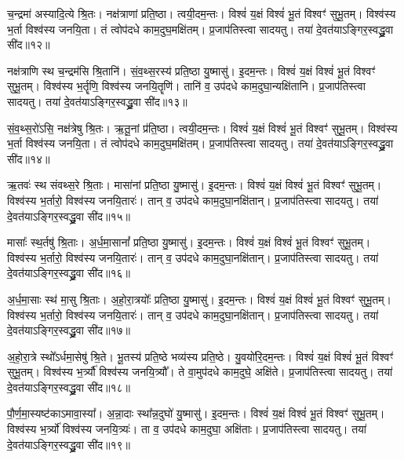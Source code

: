    च॒न्द्रमा॑ अस्यादि॒त्ये श्रि॒तः।
   नक्ष॑त्राणां प्रति॒ष्ठा।
   त्वयी॒दम॒न्तः।
   विश्वं॑ य॒क्षं विश्वं॑ भू॒तं विश्वꣳ॑ सुभू॒तम्।
   विश्व॑स्य भ॒र्ता विश्व॑स्य जनयि॒ता।
   तं त्वोप॑दधे काम॒दुघ॒मक्षि॑तम्।
   प्र॒जाप॑तिस्त्वा सादयतु।
   तया॑ दे॒वत॑याऽङ्गिर॒स्वद्ध्रु॒वा सी॑द॥१२॥

   नक्ष॑त्राणि स्थ च॒न्द्रम॑सि श्रि॒तानि॑।
   सं॒व॒थ्स॒रस्य॑ प्रति॒ष्ठा यु॒ष्मासु॑। 
   इ॒दम॒न्तः।
   विश्वं॑ य॒क्षं विश्वं॑ भू॒तं विश्वꣳ॑ सुभू॒तम्।
   विश्व॑स्य भ॒र्तॄणि॒ विश्व॑स्य जनयि॒तॄणि॑।
   तानि॑ व॒ उप॑दधे काम॒दुघा॒न्यक्षि॑तानि।
   प्र॒जाप॑तिस्त्वा सादयतु।
   तया॑ दे॒वत॑याऽङ्गिर॒स्वद्ध्रु॒वा सी॑द॥१३॥

   सं॒व॒थ्स॒रो॑ऽसि॒ नक्ष॑त्रेषु श्रि॒तः।
   ऋ॒तू॒नां प्र॑ति॒ष्ठा। 
   त्वयी॒दम॒न्तः।
   विश्वं॑ य॒क्षं विश्वं॑ भू॒तं विश्वꣳ॑ सुभू॒तम्।
   विश्व॑स्य भ॒र्ता विश्व॑स्य जनयि॒ता।
   तं त्वोप॑दधे काम॒दुघ॒मक्षि॑तम्।
   प्र॒जाप॑तिस्त्वा सादयतु।
   तया॑ दे॒वत॑याऽङ्गिर॒स्वद्ध्रु॒वा सी॑द॥१४॥

   ऋ॒तवः॑ स्थ संवथ्स॒रे श्रि॒ताः।
   मासा॑नां प्रति॒ष्ठा यु॒ष्मासु॑। 
   इ॒दम॒न्तः।
   विश्वं॑ य॒क्षं विश्वं॑ भू॒तं विश्वꣳ॑ सुभू॒तम्।
   विश्व॑स्य भ॒र्तारो॒ विश्व॑स्य जनयि॒तारः॑।
   तान् व॒ उप॑दधे काम॒दुघा॒नक्षि॑तान्।
   प्र॒जाप॑तिस्त्वा सादयतु।
   तया॑ दे॒वत॑याऽङ्गिर॒स्वद्ध्रु॒वा सी॑द॥१५॥

   मासाः᳚ स्थ॒र्तषु॑ श्रि॒ताः।
   अ॒र्ध॒मा॒सानां᳚ प्रति॒ष्ठा यु॒ष्मासु॑। 
   इ॒दम॒न्तः।
   विश्वं॑ य॒क्षं विश्वं॑ भू॒तं विश्वꣳ॑ सुभू॒तम्।
   विश्व॑स्य भ॒र्तारो॒ विश्व॑स्य जनयि॒तारः॑।
   तान् व॒ उप॑दधे काम॒दुघा॒नक्षि॑तान्।
   प्र॒जाप॑तिस्त्वा सादयतु।
   तया॑ दे॒वत॑याऽङ्गिर॒स्वद्ध्रु॒वा सी॑द॥१६॥

   अ॒र्ध॒मा॒साः स्थ॑ मा॒सु श्रि॒ताः।
   अ॒हो॒रा॒त्रयोः᳚ प्रति॒ष्ठा यु॒ष्मासु॑। 
   इ॒दम॒न्तः।
   विश्वं॑ य॒क्षं विश्वं॑ भू॒तं विश्वꣳ॑ सुभू॒तम्।
   विश्व॑स्य भ॒र्तारो॒ विश्व॑स्य जनयि॒तारः॑।
   तान् व॒ उप॑दधे काम॒दुघा॒नक्षि॑तान्।
   प्र॒जाप॑तिस्त्वा सादयतु।
   तया॑ दे॒वत॑याऽङ्गिर॒स्वद्ध्रु॒वा सी॑द॥१७॥

   अ॒हो॒रा॒त्रे स्थो᳚ऽर्धमा॒सेषु॑ श्रि॒ते।
   भू॒तस्य॑ प्रति॒ष्ठे भव्य॑स्य प्रति॒ष्ठे।
   यु॒वयो॑रि॒दम॒न्तः।
   विश्वं॑ य॒क्षं विश्वं॑ भू॒तं विश्वꣳ॑ सुभू॒तम्।
   विश्व॑स्य भ॒र्त्र्यौ॑ विश्व॑स्य जनयि॒त्र्यौ᳚।
   ते वा॒मुप॑दधे काम॒दुघे॒ अक्षि॑ते।
   प्र॒जाप॑तिस्त्वा सादयतु।
   तया॑ दे॒वत॑याऽङ्गिर॒स्वद्ध्रु॒वा सी॑द॥१८॥

   पौ॒र्ण॒मा॒स्यष्ट॑काऽमावा॒स्या᳚।
   अ॒न्ना॒दाः स्था᳚न्न॒दुघो॑ यु॒ष्मासु॑। 
   इ॒दम॒न्तः।
   विश्वं॑ य॒क्षं विश्वं॑ भू॒तं विश्वꣳ॑ सुभू॒तम्।
   विश्व॑स्य भ॒र्त्र्यो॑ विश्व॑स्य जनयि॒त्र्यः॑।
   ता व॒ उप॑दधे काम॒दुघा॒ अक्षि॑ताः।
   प्र॒जाप॑तिस्त्वा सादयतु।
   तया॑ दे॒वत॑याऽङ्गिर॒स्वद्ध्रु॒वा सी॑द॥१९॥


